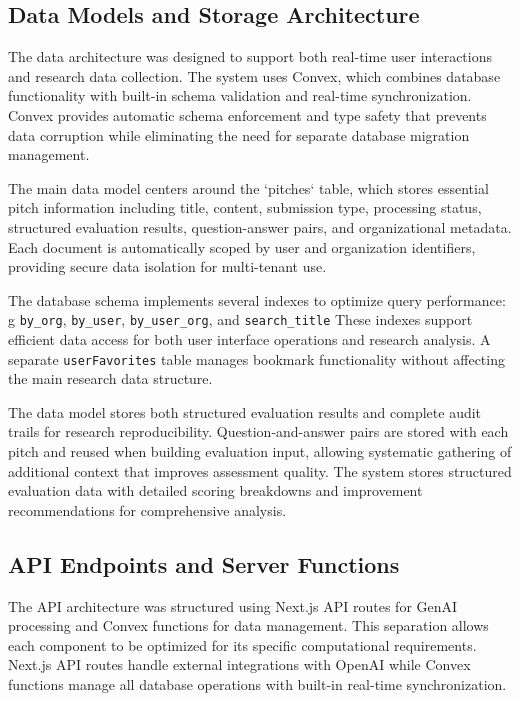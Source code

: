 \subsection{Data Models and Storage Architecture}\label{subsec:data-models-and-storage-architecture}

The data architecture was designed to support both real-time user interactions and research data collection. The system uses Convex, which combines database functionality with built-in schema validation and real-time synchronization. Convex provides automatic schema enforcement and type safety that prevents data corruption while eliminating the need for separate database migration management.

The main data model centers around the `pitches` table, which stores essential pitch information including title, content, submission type, processing status, structured evaluation results, question-answer pairs, and organizational metadata. Each document is automatically scoped by user and organization identifiers, providing secure data isolation for multi-tenant use.

The database schema implements several indexes to optimize query performance: g \texttt{by\_org}, \texttt{by\_user}, \texttt{by\_user\_org}, and \texttt{search\_title} These indexes support efficient data access for both user interface operations and research analysis. A separate \texttt{userFavorites} table manages bookmark functionality without affecting the main research data structure.

The data model stores both structured evaluation results and complete audit trails for research reproducibility. Question-and-answer pairs are stored with each pitch and reused when building evaluation input, allowing systematic gathering of additional context that improves assessment quality. The system stores structured evaluation data with detailed scoring breakdowns and improvement recommendations for comprehensive analysis.

\subsection{API Endpoints and Server Functions}\label{subsec:api-and-server}

The API architecture was structured using Next.js API routes for GenAI processing and Convex functions for data management. This separation allows each component to be optimized for its specific computational requirements. Next.js API routes handle external integrations with OpenAI while Convex functions manage all database operations with built-in real-time synchronization.

